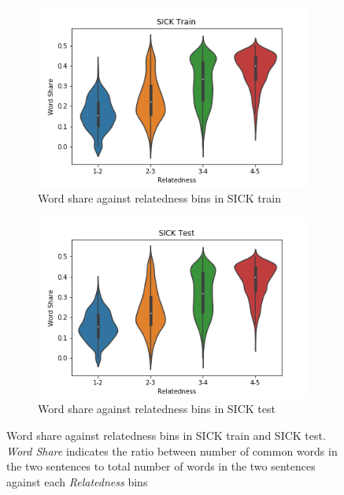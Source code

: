 \begin{enumerate}
\begin{figure}
	\captionsetup[subfigure]{justification=centering}
	\centering
	\begin{subfigure}[b]{.5\textwidth}
		\centering
		\includegraphics[width=\textwidth]{figures/semantic_textual_similarity/introduction/sick_train_word_share.png}
		\caption{Word share against relatedness bins in SICK train}
		\label{fig:sick_train_word_share}
	\end{subfigure}%
	\begin{subfigure}[b]{.5\textwidth}
		\centering
		\includegraphics[width=\textwidth]{figures/semantic_textual_similarity/introduction/sick_test_word_share.png}
		\caption{Word share against relatedness bins in SICK test}
		\label{fig:sick_test_word_share}
	\end{subfigure}
	\caption[Word share against relatedness bins in SICK train and SICK test.]{Word share against relatedness bins in SICK train and SICK test. \textit{Word Share} indicates the ratio between number of common words in the two sentences to total number of words in the two sentences against each \textit{Relatedness} bins}
	\label{fig:sick_word_share}
\end{figure}


\end{enumerate}
